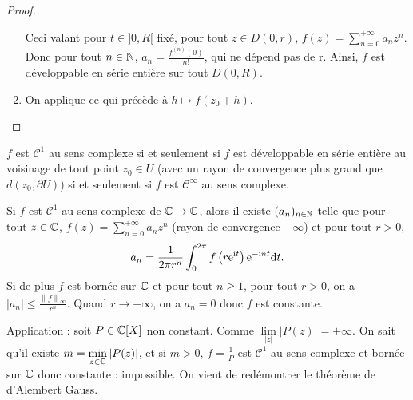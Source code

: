 \documentclass[12pt]{article}
\begin{document}
\begin{proof}
\begin{enumerate}
        Ceci valant pour $t\in]0,R[$ fixé, pour tout $z\in D(0,r)$, $f(z)=\sum_{n=0}^{+\infty}a_n z^{n}$. Donc pour tout $n\in\mathbb{N}$, $a_n=\frac{f^{(n)}(0)}{n!}$, qui ne dépend pas de r. Ainsi, $f$ est développable en série entière sur tout $D(0,R)$.

        \item On applique ce qui précède à $h\mapsto f(z_{0}+h)$.
    \end{enumerate}
\end{proof}

\begin{remark}
    $f$ est $\mathcal{C}^{1}$ au sens complexe si et seulement si $f$ est développable en série entière au voisinage de tout point $z_{0}\in U$ (avec un rayon de convergence plus grand que $d(z_{0},\partial U)$) si et seulement si $f$ est $\mathcal{C}^{\infty}$ au sens complexe.
\end{remark}

\begin{remark}
    Si $f$ est $\mathcal{C}^{1}$ au sens complexe de $\mathbb{C}\to\mathbb{C}$, alors il existe $(a_n)_{n\in\mathbb{N}}$ telle que pour tout $z\in\mathbb{C}$, $f(z)=\sum_{n=0}^{+\infty}a_nz^{n}$ (rayon de convergence $+\infty$) et pour tout $r>0$,
    \begin{equation}
        a_n=\frac{1}{2\pi r^{n}}\int_{0}^{2\pi}f\left(r\mathrm{e}^{\mathrm{i} t}\right)\mathrm{e}^{-\mathrm{i} nt}\mathrm{d} t.
    \end{equation}
    Si de plus $f$ est bornée sur $\mathbb{C}$ et pour tout $n\geqslant1$, pour tout $r>0$, on a $\left\lvert a_n\right\rvert\leqslant\frac{\left\lVert f\right\rVert_{\infty}}{r^{n}}$. Quand $r\to+\infty$, on a $a_n=0$ donc $f$ est constante.

    Application : soit $P\in\mathbb{C}[X]$ non constant. Comme $\lim\limits_{\left\lvert z\right\rvert}\left\lvert P(z)\right\rvert=+\infty$. On sait qu'il existe $m=\min\limits_{z\in\mathbb{C}}\left\lvert P(z)\right\rvert$, et si $m>0$, $f=\frac{1}{P}$ est $\mathcal{C}^{1}$ au sens complexe et bornée sur $\mathbb{C}$ donc constante : impossible. On vient de redémontrer le théorème de d'Alembert Gauss.
\end{remark}
\end{document}
